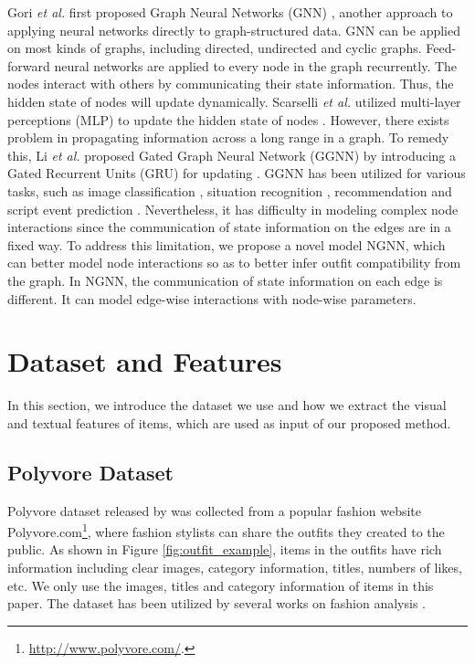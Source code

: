 \documentclass[sigconf]{acmart}
\begin{document}
Gori \emph{et al.} first proposed Graph Neural Networks (GNN) \cite{gori2005new}, another approach to applying neural networks directly to graph-structured data.
GNN can be applied on most kinds of graphs, including directed, undirected and cyclic graphs.
Feed-forward neural networks are applied to every node in the graph recurrently.
The nodes interact with others by communicating their state information.
Thus, the hidden state of nodes will update dynamically.
Scarselli \emph{et al.} utilized multi-layer perceptions (MLP) to update the hidden state of nodes \cite{scarselli2009graph}.
However, there exists problem in propagating information across a long range in a graph.
To remedy this, Li \emph{et al.} proposed Gated Graph Neural Network (GGNN) by introducing a Gated Recurrent Units (GRU) for updating \cite{li2015gated}.
GGNN has been utilized for various tasks, such as image classification \cite{marino2017more}, situation recognition \cite{li2017situation}, recommendation \cite{Wu2018Session} and script event prediction \cite{Zhongyang2018Constructing}.
Nevertheless, it has difficulty in modeling complex node interactions since the communication of state information on the edges are in a fixed way.
To address this limitation, we propose a novel model NGNN, which can better model node interactions so as to better infer outfit compatibility from the graph.
In NGNN, the communication of state information on each edge is different. It can model edge-wise interactions with node-wise parameters.


\section{Dataset and Features}
In this section, we introduce the dataset we use and how we extract the visual and textual features of items, which are used as input of our proposed method.

\subsection{Polyvore Dataset} \label{sect:dataset}
Polyvore dataset released by \cite{han2017learning} was collected from a popular fashion website Polyvore.com\footnote{\url{http://www.polyvore.com/}.}, where fashion stylists can share the outfits they created to the public. As shown in Figure \ref{fig:outfit_example}, items in the outfits have rich information including clear images, category information, titles, numbers of likes, etc.
We only use the images, titles and category information of items in this paper.
The dataset has been utilized by several works on fashion analysis \cite{Hu2015Collaborative,
li2017mining,song2017neurostylist}.
\end{document}
